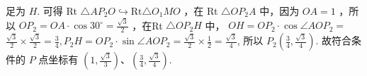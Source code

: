 \documentclass[10pt]{article}
\begin{document}
足为 $H$. 可得 Rt $\triangle A P_{2} O \hookrightarrow \mathrm{Rt} \triangle O_{1} M O$ ，在 Rt $\triangle O P_{2} A$ 中，因为 $O A=1$ ，所以 $O P_{2}=O A \cdot \cos 30^{\circ}=\frac{\sqrt{3}}{2}$ ，在Rt $\triangle O P_{2} H$ 中， $O H=O P_{2} \cdot \cos \angle A O P_{2}=$ $\frac{\sqrt{3}}{2} \times \frac{\sqrt{3}}{2}=\frac{3}{4}, P_{2} H=O P_{2} \cdot \sin \angle A O P_{2}=\frac{\sqrt{3}}{2} \times \frac{1}{2}=\frac{\sqrt{3}}{4}$, 所以 $P_{2}\left(\frac{3}{4}, \frac{\sqrt{3}}{4}\right)$. 故符合条件的 $P$ 点坐标有 $\left(1, \frac{\sqrt{3}}{3}\right) 、\left(\frac{3}{4}, \frac{\sqrt{3}}{4}\right)$.
\end{document}
